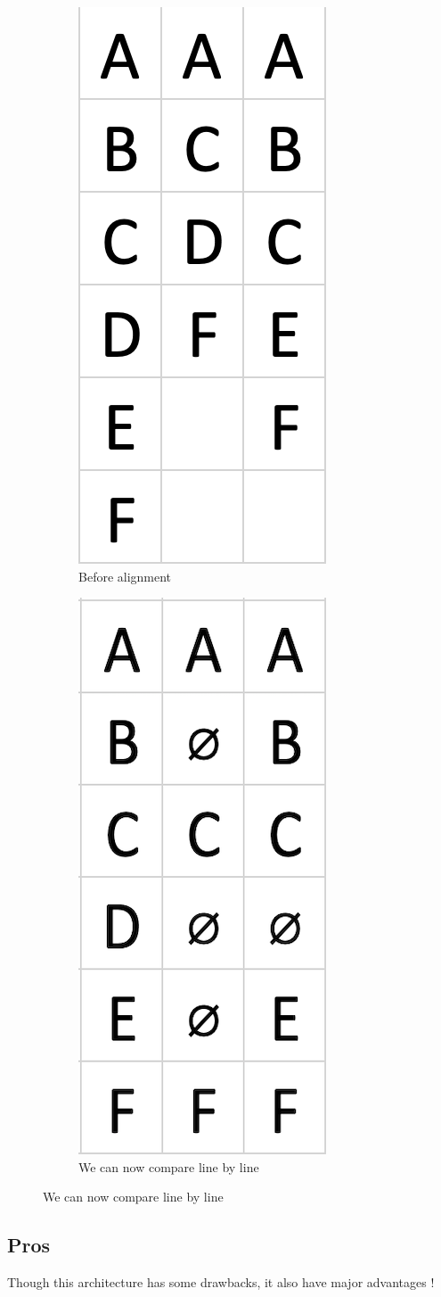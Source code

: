 \documentclass[11pt]{article}
\begin{document}
\begin{figure}[h!]
  \centering
  \begin{subfigure}[b]{0.4\linewidth}
  \centering
    \includegraphics[width=0.3\linewidth]{img/tobealigned.png}
    \caption{Before alignment}
  \end{subfigure}
  \begin{subfigure}[b]{0.4\linewidth}
  \centering
    \includegraphics[width=0.3\linewidth]{img/aligned.png}
    \caption{We can now compare line by line}
  \end{subfigure}
\end{figure}

\subsection{Pros}
Though this architecture has some drawbacks, it also have major advantages !\\
\end{document}
